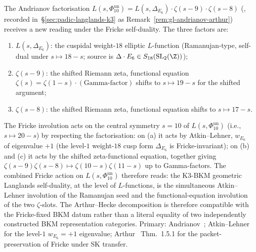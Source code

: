 \begin{remark}
\label{rem:gl-andrianov-fricke}
The Andrianov factorisation
$L(s, \Phi_{10}^{\mathrm{un}}) = L(s, \Delta_{E_6})\cdot \zeta(s-9)\cdot \zeta(s-8)$
(\cite{Andrianov1974Euler}, recorded in~\S\ref{sec:padic-langlands-k3}
as Remark~\ref{rem:gl-andrianov-arthur}) receives a new reading
under the Fricke self-duality. The three factors are:
\begin{enumerate}[label=(\alph*)]
 \item $L(s, \Delta_{E_6})$: the cuspidal weight-$18$ elliptic
 $L$-function (Ramanujan-type, self-dual under $s \mapsto 18 - s$;
 source is $\Delta \cdot E_6 \in S_{18}(\mathrm{SL}_2(\Z))$);
 \item $\zeta(s - 9)$: the shifted Riemann zeta, functional equation
 $\zeta(s) = \zeta(1-s)\cdot(\text{Gamma-factor})$ shifts to
 $s \mapsto 19 - s$ for the shifted argument;
 \item $\zeta(s - 8)$: the shifted Riemann zeta, functional equation
 shifts to $s \mapsto 17 - s$.
\end{enumerate}
The Fricke involution acts on the central symmetry
$s = 10$ of $L(s, \Phi_{10}^{\mathrm{un}})$ (i.e., $s \mapsto 20 - s$) by
respecting the factorisation: on (a) it acts by Atkin--Lehner,
$w_{E_6}$ of eigenvalue $+1$ (the level-$1$ weight-$18$ cusp form
$\Delta_{E_6}$ is Fricke-invariant); on (b) and (c) it acts by the shifted
zeta-functional equation, together giving
$\zeta(s-9)\zeta(s-8) \mapsto \zeta(10-s)\zeta(11-s)$ up to
Gamma-factors. The combined Fricke action on $L(s, \Phi_{10}^{\mathrm{un}})$
therefore reads: the K3-BKM geometric Langlands self-duality, at the
level of $L$-functions, is the simultaneous Atkin--Lehner
involution of the Ramanujan seed and the functional-equation
involution of the two $\zeta$-slots. The Arthur--Hecke decomposition is
therefore compatible with the Fricke-fixed BKM datum rather than a literal
equality of two independently constructed BKM representation categories.
Primary:
Andrianov~\cite{Andrianov1974Euler};
Atkin--Lehner~\cite{AtkinLehner1970} for the level-$1$
$w_{E_6} = +1$ eigenvalue; Arthur~\cite{Arthur2013Endoscopic}
Thm.~1.5.1 for the packet-preservation of Fricke under SK transfer.
\end{remark}


